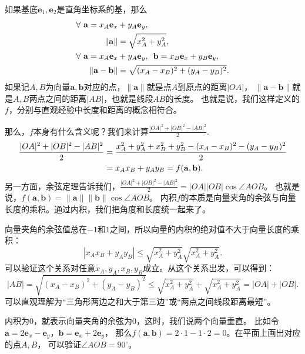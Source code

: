 \documentclass[12pt,UTF8]{ctexbook}
\begin{document}
如果基底$\mathbf{e}_1, \mathbf{e}_2$是直角坐标系的基，那么
\begin{align}
    \forall \,\, \mathbf{a} = x_A\mathbf{e}_x &+ y_A\mathbf{e}_y , \notag \\
    \| \mathbf{a}\| &= \sqrt{x_A^2 + y_A^2}, \notag \\
    \forall \,\, \mathbf{a} = x_A\mathbf{e}_x &+ y_A\mathbf{e}_y,\,\,\, \mathbf{b} = x_B\mathbf{e}_x + y_B\mathbf{e}_y , \notag \\
    \| \mathbf{a} - \mathbf{b}\| &= \sqrt{(x_A - x_B)^2 + (y_A - y_B)^2}. \notag
\end{align}
如果记$A, B$为向量$\mathbf{a}, \mathbf{b}$对应的点，$\| \mathbf{a} \|$就是点$A$到原点的距离$|OA|$，
$\|\mathbf{a} - \mathbf{b}\|$就是$A,B$两点之间的距离$|AB|$，也就是线段$AB$的长度。
也就是说，我们这样定义的$f$，分别与直观经验中长度和距离的概念相符合。

那么，$f$本身有什么含义呢？我们来计算$ \frac{|OA|^2 + |OB|^2 - |AB|^2}{2}.$
\begin{align}
    \frac{|OA|^2 + |OB|^2 - |AB|^2}{2} &= \frac{x_A^2 + y_A^2 + x_B^2 + y_B^2 - (x_A - x_B)^2 - (y_A - y_B)^2}{2} \notag \\
    &= x_Ax_B + y_Ay_B = f(\mathbf{a}, \mathbf{b}). \notag 
\end{align}
另一方面，余弦定理告诉我们，$ \frac{|OA|^2 + |OB|^2 - |AB|^2}{2} = |OA||OB|\cos \angle AOB$。
也就是说，$f(\mathbf{a}, \mathbf{b}) = \|\mathbf{a}\| \|\mathbf{b}\| \cos \angle AOB$。%
内积$f$的本质是向量夹角的余弦与向量长度的乘积。通过内积，我们把角度和长度统一起来了。

向量夹角的余弦值总在$-1$和$1$之间，所以向量的内积的绝对值不大于向量长度的乘积：
$$ |x_Ax_B + y_Ay_B| \leqslant \sqrt{x_A^2 + y_A^2} \sqrt{x_A^2 + y_A^2}.$$
可以验证这个关系对任意$x_A, y_A, x_B, y_B$成立。从这个关系出发，可以得到：
$$ |AB| = \sqrt{(x_A - x_B)^2 + (y_A - y_B)^2} \leqslant \sqrt{x_A^2 + y_A^2} + \sqrt{x_A^2 + y_A^2} = |OA| + |OB|.$$
可以直观理解为“三角形两边之和大于第三边”或“两点之间线段距离最短”。

内积为$0$，就表示向量夹角的余弦为$0$，这时，我们说两个向量垂直。
比如令$\mathbf{a} = 2\mathbf{e}_x - \mathbf{e}_y$，$\mathbf{b} = \mathbf{e}_x + 2\mathbf{e}_y$，
那么$f(\mathbf{a}, \mathbf{b}) = 2\cdot 1 - 1\cdot 2 = 0$。在平面上画出对应的点$A,B$，
可以验证$\angle AOB = 90^\circ$。
\end{document}
